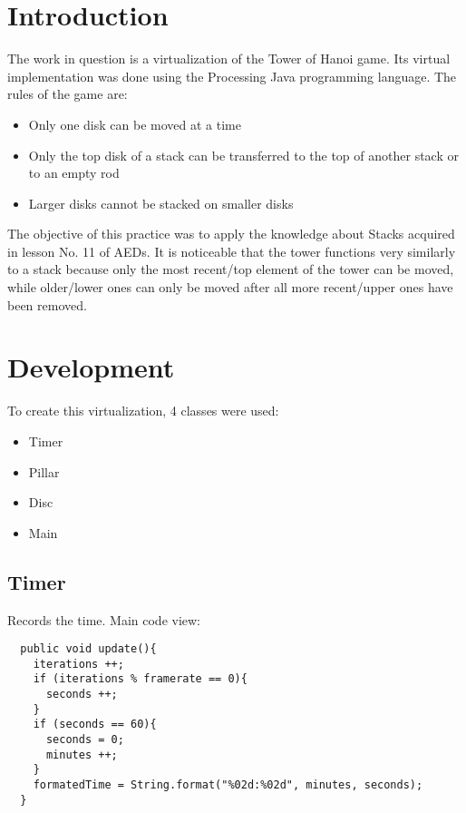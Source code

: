 \documentclass[
	12pt,				%
	oneside,			%
	a4paper,			%
	english,			%
	brazil,				%
	]{abntex2}
\begin{document}
\frenchspacing 

\imprimircapa

{
\ABNTEXchapterfont

\textual

\section{Introduction}

The work in question is a virtualization of the Tower of Hanoi game. Its virtual implementation was done using the Processing Java programming language. The rules of the game are:

\begin{itemize}
\item Only one disk can be moved at a time
\item Only the top disk of a stack can be transferred to the top of another stack or to an empty rod
\item Larger disks cannot be stacked on smaller disks
\end{itemize}

The objective of this practice was to apply the knowledge about Stacks acquired in lesson No. 11 of AEDs. It is noticeable that the tower functions very similarly to a stack because only the most recent/top element of the tower can be moved, while older/lower ones can only be moved after all more recent/upper ones have been removed.

\section{Development}

To create this virtualization, 4 classes were used:
\begin{itemize}
 \item Timer
 \item Pillar
 \item Disc
 \item Main
\end{itemize}

 \subsection{Timer}
 Records the time. Main code view:
  \begin{itshape}
 \begin{verbatim}
  public void update(){
    iterations ++;
    if (iterations % framerate == 0){
      seconds ++;
    }
    if (seconds == 60){
      seconds = 0;
      minutes ++;
    }
    formatedTime = String.format("%02d:%02d", minutes, seconds); 
  }
 \end{verbatim}
 \end{itshape}
}
\end{document}
